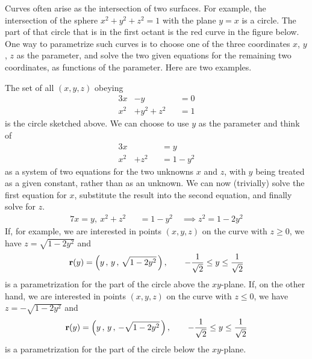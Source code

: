 Curves often arise as the intersection of two surfaces. For example,
the intersection of the sphere $x^2+y^2+z^2=1$
with the plane $y=x$ is a circle. The part of that circle that is
in the first octant is the red curve in the figure below.
One way to parametrize such curves is to
choose one of the three coordinates $x$, $y$, $z$ as the parameter,
and solve the two given equations for the remaining two coordinates,
as functions of the parameter. Here are two examples.

\begin{eg}\label{eg:paramIntersectA}
The set of all $(x,y,z)$ obeying
\begin{alignat*}{3}
 x&-y           &&=0 \\
 x^2&+y^2 +z^2 &&=1
\end{alignat*}
is the circle sketched above. We can choose to use $y$ as the parameter and think of 
\begin{alignat*}{3}
 x&    &&=y \\
 x^2&+z^2  &&=1-y^2
\end{alignat*}
as a system of two equations for the two unknowns $x$ and $z$,
with $y$ being treated as a given constant, rather than as an unknown.
We can now (trivially) solve the first equation for $x$, substitute 
the result into the second equation, and finally solve for $z$.
\begin{alignat*}{7}
x=y,\  x^2+z^2  &&=1-y^2 \quad \implies z^2 = 1-2y^2
\end{alignat*}
If, for example, we are interested in points $(x,y,z)$ on the curve with 
$z\ge 0$, we have $z=\sqrt{1-2y^2} $ and 
\begin{equation*}
\mathbf{r}(y) = \left(y\,,\,y\,,\,\sqrt{1-2y^2}\,\right),\qquad
-\frac{1}{\sqrt{2}}\le y \le \frac{1}{\sqrt{2}}
\end{equation*}
is a parametrization for the part of the circle above the $xy$-plane.
If, on the other hand, we are interested in points $(x,y,z)$ on the curve with 
$z\le 0$, we have $z=-\sqrt{1-2y^2} $ and 
\begin{equation*}
\mathbf{r}(y) = \left(y\,,\,y\,,\,-\sqrt{1-2y^2}\,\right),\qquad
-\frac{1}{\sqrt{2}}\le y \le \frac{1}{\sqrt{2}}
\end{equation*}
is a parametrization for the part of the circle below the $xy$-plane.
\end{eg}


